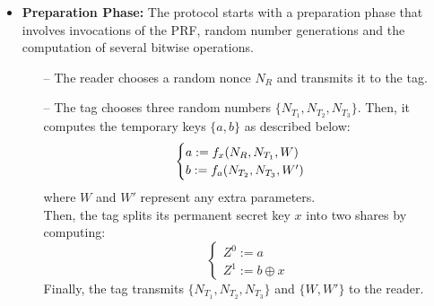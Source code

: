 \documentclass{article}
\begin{document}
\begin{itemize}
\item \textbf{Preparation Phase:} The protocol starts with a preparation phase that involves invocations of the PRF, random number generations and the computation of several bitwise operations.
\begin{itemize}
  \item [--] The reader chooses a random nonce $N_R$ and transmits it to the tag.
  \item [--] The tag chooses three random numbers $\{N_{T_{1}}, N_{T_{2}}, N_{T_{3}} \}$. Then, it computes the temporary keys $\{a, b\}$ as described below:
\begin{equation*}
      \begin{cases}
      a:=f_{x}(N_{R}, N_{T_1}, W)\\
      b:=f_a(N_{T_{2}}, N_{T_{3}}, W') \\
      \end{cases}\\
\end{equation*}
      where $W$ and $W'$ represent any extra parameters.\\
      Then, the tag splits its permanent secret key $x$ into two shares by computing:
      \begin{equation*}
      \begin{cases}Z^{0}:=a\\
				   Z^{1}:= b \oplus x \end{cases}
      \end{equation*}
      Finally, the tag transmits $\{N_{T_{1}}, N_{T_{2}}, N_{T_{3}} \}$ and $\{W, W'\}$ to the reader.
\end{itemize}


\end{itemize}
\end{document}
